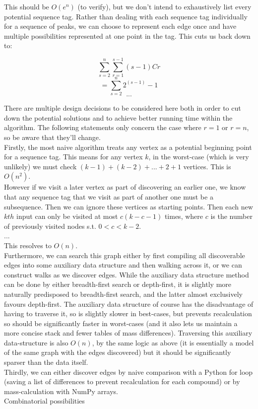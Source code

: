 \documentclass{article}
\begin{document}
This should be \(O(e^n)\) (to verify), but we don't intend to exhaustively list every potential sequence tag.
Rather than dealing with each sequence tag individually for a sequence of peaks, we can choose to represent each edge once and have multiple possibilities
represented at one point in the tag. This cuts us back down to:

\[\sum_{s=2}^{n}{\sum_{r=1}^{s-1}{(s-1)Cr}}\]
\[= \sum_{s=2}^{n}{2^{(s-1)} - 1}\]
\[...\]

There are multiple design decisions to be considered here both in order to cut down the potential solutions and to achieve better running time within the algorithm.
The following statements only concern the case where \(r=1\) or \(r=n\), so be aware that they'll change. \\

Firstly, the most naive algorithm treats any vertex as a potential beginning point for a sequence tag.
This means for any vertex \(k\), in the worst-case (which is very unlikely) we must check \((k-1)+(k-2)+... +2+1\) vertices.
This is \(O(n^2)\). \\

However if we visit a later vertex as part of discovering an earlier one, we know that any sequence tag that we visit as part of another one must be a subsequence.
Then we can ignore these vertices as starting points.
Then each new \(kth\) input can only be visited at most \(c(k-c-1)\) times, where \(c\) is the number of previously visited nodes s.t. \(0<c<k-2\). \\
... \\
This resolves to \(O(n)\). \\

Furthermore, we can search this graph either by first compiling all discoverable edges into some auxiliary data structure and then walking across it,
or we can construct walks as we discover edges.
While the auxiliary data structure method can be done by either breadth-first search or depth-first, it is slightly more naturally predisposed to breadth-first search,
and the latter almost exclusively favours depth-first.
The auxiliary data structure of course has the disadvantage of having to traverse it, so is slightly slower in best-cases, but prevents recalculation so should be
significantly faster in worst-cases (and it also lets us maintain a more concise stack and fewer tables of mass differences).
Traversing this auxiliary data-structure is also \(O(n)\), by the same logic as above (it is essentially a model of the same graph with the edges discovered)
but it should be significantly sparser than the data itself. \\

Thirdly, we can either discover edges by naive comparison with a Python for loop (saving a list of differences to prevent recalculation for each compound)
or by mass-calculation with NumPy arrays. \\

Combinatorial possibilities
\end{document}
